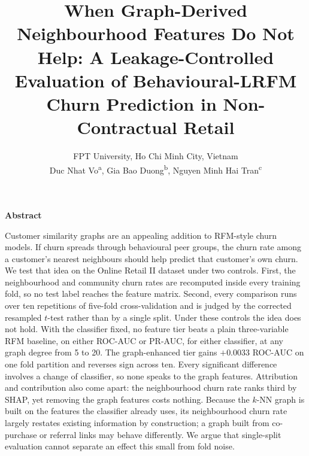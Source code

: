 \documentclass[runningheads]{llncs}
\makeatletter
\def\abstractname{Abstract}
\renewenvironment{abstract}{%
  \list{}{\advance\topsep by0.35cm\relax\small
    \leftmargin=\z@
    \rightmargin=\z@
    \labelwidth=\z@
    \listparindent=\z@
    \itemindent=\z@}%
  \item[]{\centering\bfseries\abstractname\par}\nobreak\vskip 3pt\noindent\ignorespaces}%
  {\endlist}
\makeatother
\begin{document}
\title{When Graph-Derived Neighbourhood Features Do Not Help:
A Leakage-Controlled Evaluation of Behavioural-LRFM Churn Prediction
in Non-Contractual Retail}


\author{{\small FPT University, Ho Chi Minh City, Vietnam}\\[4pt]
Duc Nhat Vo\textsuperscript{a}, Gia Bao Duong\textsuperscript{b},
Nguyen Minh Hai Tran\textsuperscript{c}}
\authorrunning{~}

\maketitle

\begin{abstract}
Customer similarity graphs are an appealing addition to RFM-style churn models.
If churn spreads through behavioural peer groups, the churn rate among a
customer's nearest neighbours should help predict that customer's own churn. We
test that idea on the Online Retail II dataset under two controls. First, the
neighbourhood and community churn rates are recomputed inside every training
fold, so no test label reaches the feature matrix. Second, every comparison runs
over ten repetitions of five-fold cross-validation and is judged by the corrected
resampled $t$-test rather than by a single split. Under these controls the idea
does not hold. With the classifier fixed, no feature tier beats a plain
three-variable RFM baseline, on either ROC-AUC or PR-AUC, for either classifier,
at any graph degree from 5 to 20. The graph-enhanced tier gains $+0.0033$ ROC-AUC
on one fold partition and reverses sign across ten. Every significant difference
involves a change of classifier, so none speaks to the graph features. Attribution and contribution also come apart: the
neighbourhood churn rate ranks third by SHAP, yet removing the graph features
costs nothing. Because the $k$-NN graph is built on the features the classifier
already uses, its neighbourhood churn rate largely restates existing information
by construction; a graph built from co-purchase or referral links may behave
differently. We argue that single-split evaluation cannot separate an effect this
small from fold noise.

\end{abstract}
\end{document}
